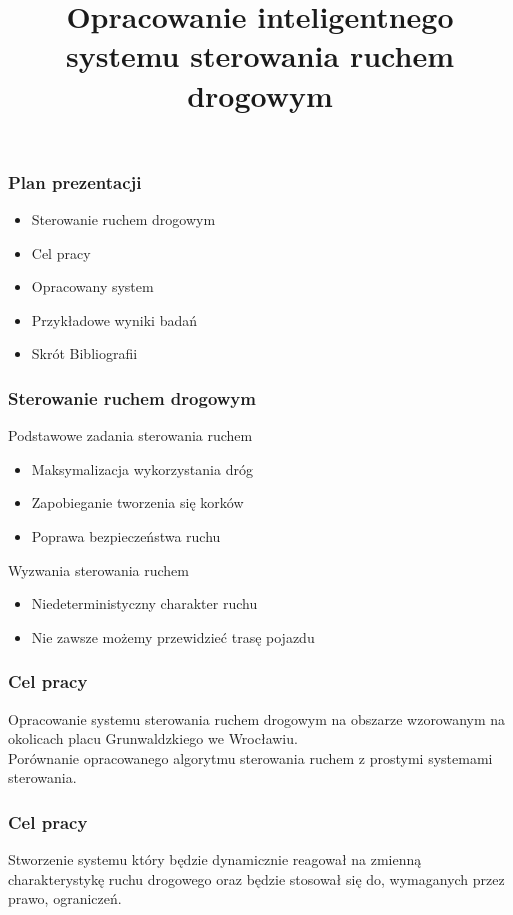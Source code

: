 \documentclass[17pt]{beamer}
\author{}
\title{Opracowanie inteligentnego systemu sterowania ruchem drogowym}
\subtitle{}
\date{}
\institute{autor: inż. Przemysław Rokosz\\\vspace{\baselineskip}promotor: dr inż. Grzegorz Filcek}
\begin{document}
\begin{frame}[plain,t]
 \maketitle
\end{frame}

\begin{frame}[shrink=5]
 \frametitle{\vspace{22px}Plan prezentacji}
 \begin{itemize}
  \item{Sterowanie ruchem drogowym}
  \item{Cel pracy}
  \item{Opracowany system}
  \item{Przykładowe wyniki badań}
  \item{Skrót Bibliografii}
 \end{itemize}
\end{frame}

\begin{frame}[shrink=5]
 \frametitle{\vspace{22px}Sterowanie ruchem drogowym}
 Podstawowe zadania sterowania ruchem
 \begin{itemize}
  \item{Maksymalizacja wykorzystania dróg}
  \item{Zapobieganie tworzenia się korków}
  \item{Poprawa bezpieczeństwa ruchu}
 \end{itemize}
 Wyzwania sterowania ruchem
 \begin{itemize}
  \item{Niedeterministyczny charakter ruchu}
  \item{Nie zawsze możemy przewidzieć trasę pojazdu}
 \end{itemize}
\end{frame}

\begin{frame}[shrink=5]
 \frametitle{\vspace{22px}Cel pracy}
 Opracowanie systemu sterowania ruchem drogowym na obszarze wzorowanym na okolicach placu Grunwaldzkiego we Wrocławiu.\\
 Porównanie opracowanego algorytmu sterowania ruchem z prostymi systemami sterowania.\\
\end{frame}

\begin{frame}[shrink=5]
 \frametitle{\vspace{22px}Cel pracy}
Stworzenie systemu który będzie dynamicznie reagował na zmienną charakterystykę ruchu drogowego oraz będzie stosował się do, wymaganych przez prawo, ograniczeń.
\end{frame}
\end{document}
